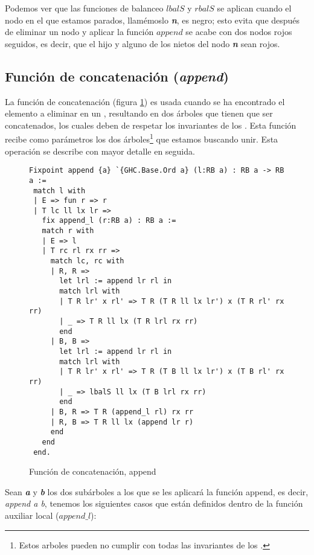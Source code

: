 Podemos ver que las funciones de balanceo \hyperref[lbalS]{$lbalS$} y \hyperref[lbalS]{$rbalS$} se 
aplican cuando el nodo en el que estamos parados, llamémoslo \textbf{\textit{n}}, es negro; esto 
evita que después de eliminar un nodo y aplicar la funci\'on \hyperref[func_app]{$append$} se acabe 
con dos nodos rojos seguidos, es decir, que el hijo y alguno de los nietos del nodo 
\textbf{\textit{n}} sean rojos.

\subsection{Funci\'on de concatenaci\'on (\textit{append})}

La funci\'on de concatenación (figura \ref{func_app}) es usada cuando se ha encontrado el elemento a 
eliminar en un {\arn}, resultando en dos \'arboles que tienen que ser concatenados, los cuales deben 
de respetar los invariantes de los {\arns}. Esta funci\'on recibe como parámetros los dos 
\'arboles\footnote{Estos arboles pueden no cumplir con todas las invariantes de los {\arns}.} que 
estamos buscando unir. Esta operación se describe con mayor detalle en seguida.

\begin{figure}[!ht]
\centering
\captionsetup{justification=centering}
\begin{verbatim}
Fixpoint append {a} `{GHC.Base.Ord a} (l:RB a) : RB a -> RB a :=
 match l with
 | E => fun r => r
 | T lc ll lx lr =>
   fix append_l (r:RB a) : RB a :=
   match r with
   | E => l
   | T rc rl rx rr =>
     match lc, rc with
     | R, R =>
       let lrl := append lr rl in
       match lrl with
       | T R lr' x rl' => T R (T R ll lx lr') x (T R rl' rx rr)
       | _ => T R ll lx (T R lrl rx rr)
       end
     | B, B =>
       let lrl := append lr rl in
       match lrl with
       | T R lr' x rl' => T R (T B ll lx lr') x (T B rl' rx rr)
       | _ => lbalS ll lx (T B lrl rx rr)
       end
     | B, R => T R (append_l rl) rx rr
     | R, B => T R ll lx (append lr r)
     end
   end
 end.
\end{verbatim}
\caption{Funci\'on de concatenaci\'on, append}
\label{func_app}
\end{figure}


Sean \textbf{\textit{a}} y \textbf{\textit{b}} los dos subárboles a los que se les aplicar\'a la 
funci\'on append, es decir, \textit{append a b}, tenemos los siguientes casos que están definidos 
dentro de la funci\'on auxiliar local ($append\_l$):

